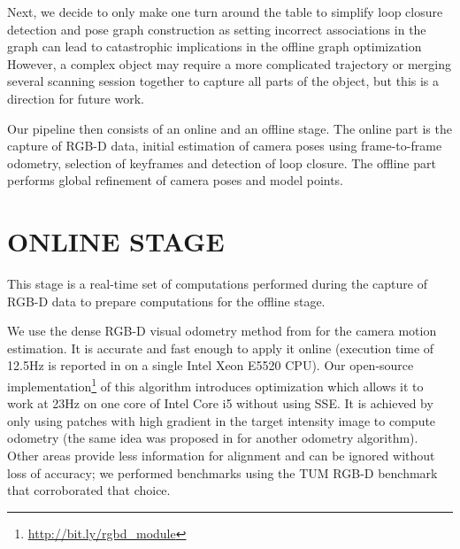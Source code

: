 \documentclass[letterpaper, 10 pt, conference]{ieeeconf}  %
\begin{document}

Next, we decide to only make one turn around the table to simplify loop closure detection and pose graph construction as
setting incorrect associations
in the graph can lead to catastrophic implications in the offline graph
optimization \cite{sunderhauf2012switchable}
However, a complex object may require a more complicated trajectory
or merging several scanning session together to capture all parts of the object, %
but this is a direction for future work.

Our pipeline then consists of an online and an offline stage. The online part is the capture of RGB-D data,
initial estimation of camera poses using frame-to-frame odometry,
selection of keyframes and detection of loop closure. The offline part performs
global refinement of camera poses and model points.

\section{ONLINE STAGE}

\label{sec:online}

This stage is a real-time set of computations performed during the capture of RGB-D data to prepare computations for 
the offline stage.

We use the dense RGB-D visual odometry
method from \cite{steinbrucker2011real} for the camera motion estimation.
It is accurate and fast enough to apply it online
(execution time of 12.5Hz is reported in \cite{steinbrucker2011real}
on a single Intel Xeon E5520 CPU).
Our open-source implementation\footnote{\label{note1}\href{http://bit.ly/rgbd\_module}{http://bit.ly/rgbd\_module}} of this algorithm
introduces optimization which allows it to work at 23Hz on one core
of Intel Core i5 without using SSE.
It is achieved by only using patches with high gradient in the target intensity image
to compute odometry (the same idea was proposed in \cite{tykkala2011direct} for another odometry algorithm).
Other areas provide less information for alignment
and can be ignored without loss of accuracy; we performed benchmarks 
using the TUM RGB-D benchmark \cite{sturm12iros} that corroborated that choice.
\end{document}
